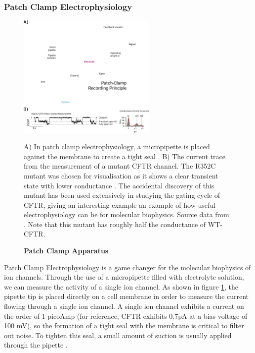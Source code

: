 \subsubsection{Patch Clamp Electrophysiology}
\begin{figure}
	\label{patch_clamp}
	\begin{center}
	\includegraphics[width=0.6\textwidth]{figures/R352C_ephys_measurement_figure.pdf}
	\end{center}
	\captionsetup{singlelinecheck = false, justification=raggedright}
	\caption[Patch Clamp Apparatus] {\textbf{Patch Clamp Apparatus}}{A) In patch clamp electrophysiology, a micropipette is placed against the membrane to create a tight seal \cite{patch_clamp_recording_principal_figure}. B) The current trace from the measurement of a mutant CFTR channel. The R352C mutant was chosen for visualisation as it shows a clear transient state with lower conductance \cite{jih2012}. The accidental discovery of this mutant has been used extensively in studying the gating cycle of CFTR, giving an interesting example an example of how useful electrophysiology can be for molecular biophysics. Source data from \cite{jih2012}. Note that this mutant has roughly half the conductance of WT-CFTR.} 
\end{figure}
Patch Clamp Electrophysiology is a game changer for the molecular biophysics of ion channels. Through the use of a micropipette filled with electrolyte solution, we can measure the activity of a single ion channel. As shown in figure \ref{patch_clamp}, the pipette tip is placed directly on a cell membrane in order to measure the current flowing through a single ion channel. A single ion channel exhibits a current on the order of 1 picoAmp (for reference, CFTR exhibits 0.7pA at a bias voltage of 100 mV), so the formation of a tight seal with the membrane is critical to filter out noise. To tighten this seal, a small amount of suction is usually applied through the pipette \cite{aidley1996}.

